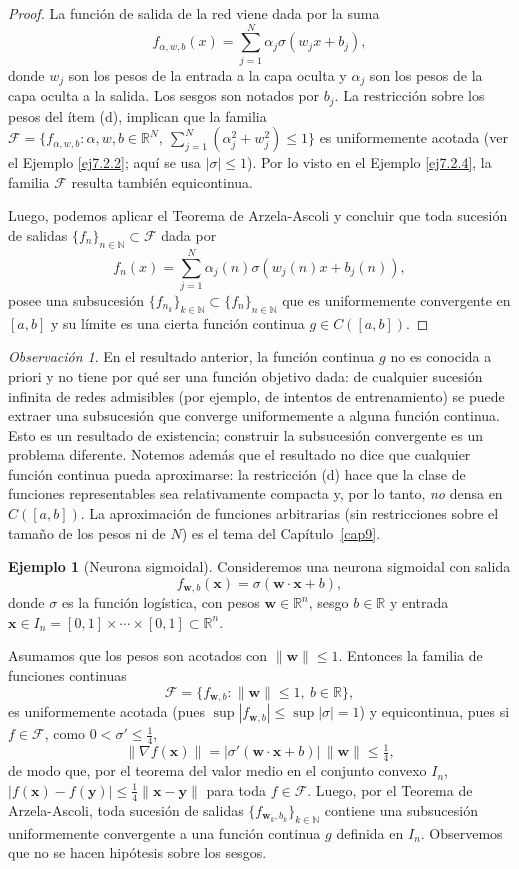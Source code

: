 \documentclass[12pt, a4paper]{amsbook}
\newcommand{\R}{{\mathbb R}}
\newcommand{\N}{{\mathbb N}}
\newcommand{\F}{{\mathcal F}}
\newcommand{\ww}{{\mathbf w}}
\newcommand{\xx}{{\mathbf x}}
\newcommand{\yy}{{\mathbf y}}
\theoremstyle{remark}
\newtheorem{obs}[teo]{Observaci\'on}
\theoremstyle{definition}
\newtheorem{ejem}[teo]{Ejemplo}
\numberwithin{section}{chapter}
\numberwithin{subsection}{section}
\numberwithin{equation}{section}
\numberwithin{figure}{chapter}
\begin{document}
\begin{proof}
La función de salida de la red viene dada por la suma
$$
f_{\alpha, w, b}(x) = \sum_{j=1}^N \alpha_j \sigma(w_j x + b_j),
$$
donde $w_j$ son los pesos de la entrada a la capa oculta y $\alpha_j$ son los pesos de la capa oculta a la salida. Los sesgos son notados por $b_j$. La restricción sobre los pesos del ítem (d), implican que la familia $\F=\{f_{\alpha, w, b}\colon \alpha, w, b\in \R^N,\ \sum_{j=1}^N(\alpha_j^2+w_j^2)\le1\}$ es uniformemente acotada (ver el Ejemplo \ref{ej7.2.2}; aquí se usa $|\sigma|\le1$). Por lo visto en el Ejemplo \ref{ej7.2.4}, la familia $\F$ resulta también equicontinua.

Luego, podemos aplicar el Teorema de Arzela-Ascoli y concluir que toda sucesión de salidas $\{f_n\}_{n\in\N}\subset \F$ dada por
$$
f_n(x) = \sum_{j=1}^N \alpha_j(n) \sigma(w_j(n) x + b_j(n)),
$$
posee una subsucesión $\{f_{n_k}\}_{k\in\N}\subset \{f_n\}_{n\in\N}$ que es uniformemente convergente en $[a, b]$ y su límite es una cierta función continua $g\in C([a, b])$.
\end{proof}

\begin{obs}
En el resultado anterior, la función continua $g$ no es conocida a priori y no tiene por qué ser una función objetivo dada: de cualquier sucesión infinita de redes admisibles (por ejemplo, de intentos de entrenamiento) se puede extraer una subsucesión que converge uniformemente a alguna función continua. Esto es un resultado de existencia; construir la subsucesión convergente es un problema diferente. Notemos además que el resultado no dice que cualquier función continua pueda aproximarse: la restricción (d) hace que la clase de funciones representables sea relativamente compacta y, por lo tanto, {\em no} densa en $C([a,b])$. La aproximación de funciones arbitrarias (sin restricciones sobre el tamaño de los pesos ni de $N$) es el tema del Capítulo~\ref{cap9}.
\end{obs}

\begin{ejem}[Neurona sigmoidal]
Consideremos una neurona sigmoidal con salida 
$$
f_{\ww, b}(\xx) = \sigma(\ww\cdot\xx + b),
$$
donde $\sigma$ es la función logística, con pesos $\ww\in \R^n$, sesgo $b\in \R$ y entrada $\xx\in I_n = [0,1]\times\cdots\times[0,1]\subset \R^n$.

Asumamos que los pesos son acotados con $\|\ww\|\le 1$. Entonces la familia de funciones continuas
$$
\F=\{ f_{\ww, b}\colon \|\ww\|\le 1,\ b\in \R\},
$$
es uniformemente acotada (pues $\sup |f_{\ww, b}| \le \sup |\sigma|=1$) y equicontinua, pues si $f\in \F$, como $0<\sigma'\le\frac14$,
$$
\|\nabla f(\xx)\| = |\sigma'(\ww\cdot\xx + b)|\,\|\ww\|\le \tfrac14,
$$
de modo que, por el teorema del valor medio en el conjunto convexo $I_n$, $|f(\xx)-f(\yy)|\le \frac14\|\xx-\yy\|$ para toda $f\in\F$.
Luego, por el Teorema de Arzela-Ascoli, toda sucesión de salidas $\{f_{\ww_k, b_k}\}_{k\in\N}$ contiene una subsucesión uniformemente convergente a una función continua $g$ definida en $I_n$. Observemos que no se hacen hipótesis sobre los sesgos.
\end{ejem}
\end{document}
